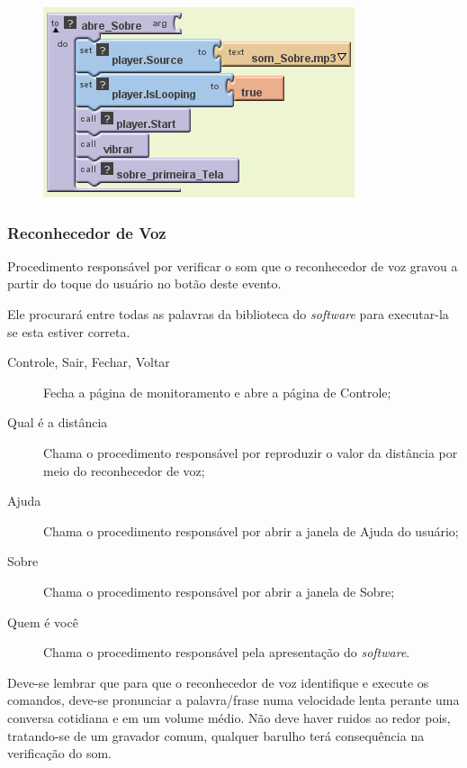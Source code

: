 \documentclass[portugues, brazil, a4paper,12pt]{article}
\begin{document}
\begin{figure}[H]
	\centering
	\includegraphics[scale=.8]{img/monitoramento/abreSobre.png}
	
\end{figure}

\subsubsection{Reconhecedor de Voz}
Procedimento responsável por verificar o som que o reconhecedor de voz gravou a partir do toque do usuário no botão deste evento.

Ele procurará entre todas as palavras da biblioteca do \textit{software} para executar-la se esta estiver correta.

\begin{description}
\item [Controle, Sair, Fechar, Voltar] Fecha a página de monitoramento e abre a página de Controle;
\item [Qual é a distância] Chama o procedimento responsável por reproduzir o valor da distância por meio do reconhecedor de voz;
\item [Ajuda] Chama o procedimento responsável por abrir a janela de Ajuda do usuário;
\item [Sobre] Chama o procedimento responsável por abrir a janela de Sobre;
\item [Quem é você] Chama o procedimento responsável pela apresentação do \textit{software}.
\end{description}

Deve-se lembrar que para que o reconhecedor de voz identifique e execute os comandos, deve-se pronunciar a palavra/frase numa velocidade lenta perante uma conversa cotidiana e em um volume médio. Não deve haver ruidos ao redor pois, tratando-se de um gravador comum, qualquer barulho terá consequência na verificação do som.
\end{document}
